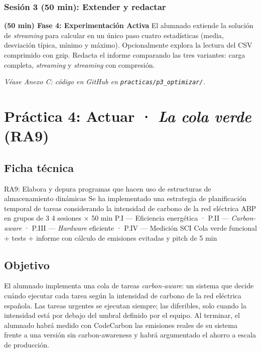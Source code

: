 \subsubsection{Sesión 3 (50 min): Extender y redactar}


\textbf{(50 min) Fase 4: Experimentación Activa} El alumnado extiende la solución de \textit{streaming} para calcular en un único paso cuatro estadísticas (media, desviación típica, mínimo y máximo). Opcionalmente explora la lectura del CSV comprimido con gzip. Redacta el informe comparando las tres variantes: carga completa, \textit{streaming} y \textit{streaming} con compresión.


\textit{Véase Anexo C: código en GitHub en \texttt{practicas/p3\_optimizar/}.}





\section{Práctica 4: Actuar · \textit{La cola verde} (RA9)}


\subsection{Ficha técnica}


  {RA9: Elabora y depura programas que hacen uso de estructuras de almacenamiento dinámicas}
  {Se ha implementado una estrategia de planificación temporal de tareas considerando la intensidad de carbono de la red eléctrica}
  {ABP en grupos de 3}
  {4 sesiones $\times$ 50 min}
  {P.I — Eficiencia energética · P.II — \textit{Carbon-aware} · P.III — \textit{Hardware} eficiente · P.IV — Medición SCI}
  {Cola verde funcional + tests + informe con cálculo de emisiones evitadas y pitch de 5 min}


\subsection{Objetivo}


El alumnado implementa una cola de tareas \textit{carbon-aware}: un sistema que decide cuándo ejecutar cada tarea según la intensidad de carbono de la red eléctrica española. Las tareas urgentes se ejecutan siempre; las diferibles, solo cuando la intensidad está por debajo del umbral definido por el equipo. Al terminar, el alumnado habrá medido con CodeCarbon las emisiones reales de su sistema frente a una versión sin carbon-awareness y habrá argumentado el ahorro a escala de producción.


